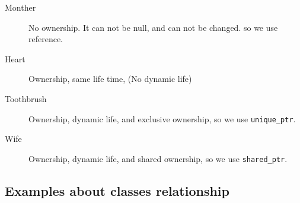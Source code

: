 \documentclass[a4paper,11pt,twoside]{book}
\begin{document}
\begin{itemize}
\begin{description}
	\item[Monther] No ownership. It can not be null, and can not be changed.  so we use reference. 
	
	\item[Heart] Ownership, same life time, (No dynamic life)
	
	\item [Toothbrush] Ownership, dynamic life, and exclusive ownership, so we use \texttt{unique\_ptr}.
	
	\item [Wife] Ownership, dynamic life, and shared ownership, so we use \texttt{shared\_ptr}.
\end{description}


\end{itemize}

\subsection{Examples about classes relationship}
\end{document}
